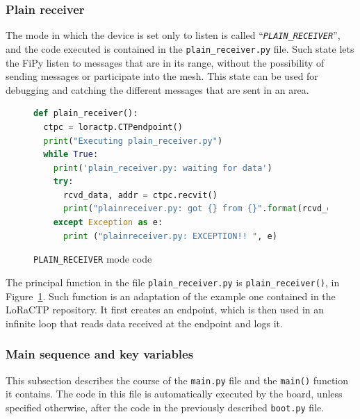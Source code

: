 			\subsubsection{Plain receiver}
			
				The mode in which the device is set only to listen is called ``\textit{\texttt{PLAIN\_RECEIVER}}'', and the code executed is contained in the \texttt{plain\_receiver.py} file.
				Such state lets the FiPy listen to messages that are in its range, without the possibility of sending messages or participate into the mesh.
				This state can be used for debugging and catching the different messages that are sent in an area.
				
				\begin{figure}[H]
					\begin{lstlisting}[language=python]
def plain_receiver():
  ctpc = loractp.CTPendpoint()
  print("Executing plain_receiver.py")
  while True:
    print('plain_receiver.py: waiting for data')
    try:
      rcvd_data, addr = ctpc.recvit()
      print("plainreceiver.py: got {} from {}".format(rcvd_data, addr))
    except Exception as e:
      print ("plainreceiver.py: EXCEPTION!! ", e)
					\end{lstlisting}
					\caption{\texttt{PLAIN\_RECEIVER} mode code}
					\label{code:plain_receiver}
				\end{figure}

				The principal function in the file \texttt{plain\_receiver.py} is \texttt{plain\_receiver()}, in Figure~\ref{code:plain_receiver}.
				Such function is an adaptation of the example one contained in the LoRaCTP repository.
				It first creates an endpoint, which is then used in an infinite loop that reads data received at the endpoint and logs it.
				
			\subsubsection{Main sequence and key variables}
			
				This subsection describes the course of the \texttt{main.py} file and the \texttt{main()} function it contains.
				The code in this file is automatically executed by the board, unless specified otherwise, after the code in the previously described \texttt{boot.py} file.
				
